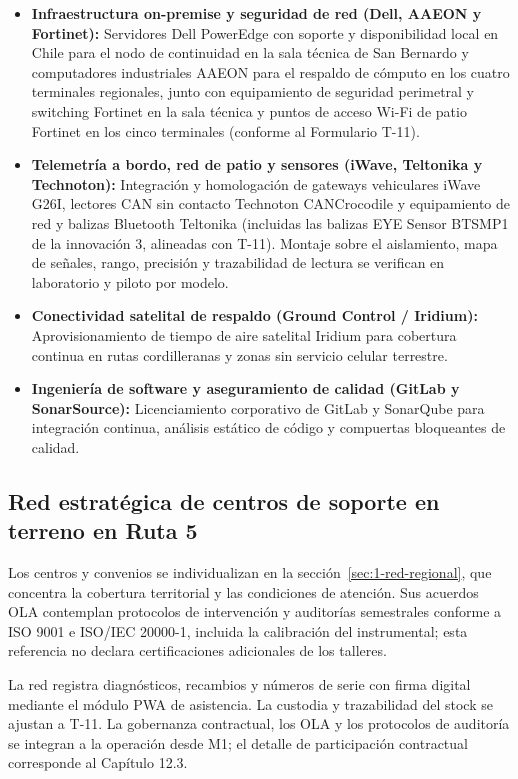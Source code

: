 \begin{itemize}
  \item \textbf{Infraestructura on-premise y seguridad de red (Dell, AAEON y Fortinet):} Servidores Dell PowerEdge con soporte y disponibilidad local en Chile para el nodo de continuidad en la sala técnica de San Bernardo y computadores industriales AAEON para el respaldo de cómputo en los cuatro terminales regionales, junto con equipamiento de seguridad perimetral y switching Fortinet en la sala técnica y puntos de acceso Wi-Fi de patio Fortinet en los cinco terminales (conforme al Formulario T-11).
  \item \textbf{Telemetría a bordo, red de patio y sensores (iWave, Teltonika y Technoton):} Integración y homologación de gateways vehiculares iWave G26I, lectores CAN sin contacto Technoton CANCrocodile y equipamiento de red y balizas Bluetooth Teltonika (incluidas las balizas EYE Sensor BTSMP1 de la innovación 3, alineadas con T-11). Montaje sobre el aislamiento, mapa de señales, rango, precisión y trazabilidad de lectura se verifican en laboratorio y piloto por modelo.
  \item \textbf{Conectividad satelital de respaldo (Ground Control / Iridium):} Aprovisionamiento de tiempo de aire satelital Iridium para cobertura continua en rutas cordilleranas y zonas sin servicio celular terrestre.
  \item \textbf{Ingeniería de software y aseguramiento de calidad (GitLab y SonarSource):} Licenciamiento corporativo de GitLab y SonarQube para integración continua, análisis estático de código y compuertas bloqueantes de calidad.
\end{itemize}

\subsection{Red estratégica de centros de soporte en terreno en Ruta 5}\label{sec:1-alianza-red}

Los centros y convenios se individualizan en la sección~\ref{sec:1-red-regional}, que concentra la cobertura territorial y las condiciones de atención. Sus acuerdos OLA contemplan protocolos de intervención y auditorías semestrales conforme a ISO 9001 e ISO/IEC 20000-1, incluida la calibración del instrumental; esta referencia no declara certificaciones adicionales de los talleres.

La red registra diagnósticos, recambios y números de serie con firma digital mediante el módulo PWA de asistencia. La custodia y trazabilidad del stock se ajustan a T-11. La gobernanza contractual, los OLA y los protocolos de auditoría se integran a la operación desde M1; el detalle de participación contractual corresponde al Capítulo 12.3.

\nocite{cisbenchmarks2024, ley19799, ley21377, ley21663, ley21719, iso9001, iso12207, iso20000_1, iso22301, iso27001, ds43minsal, ds298, codigo_trabajo_25bis, nist_sp800_207, nist_csf2, owasp_asvs4}
